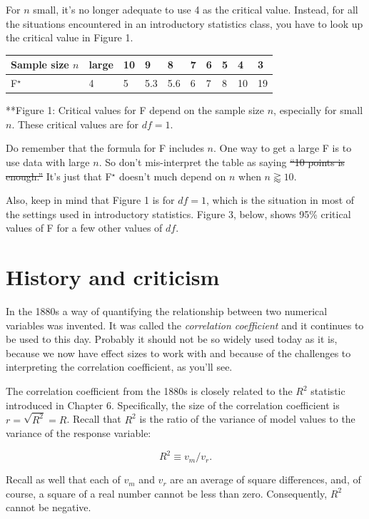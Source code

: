 \documentclass[]{book}
\begin{document}
For \(n\) small, it's no longer adequate to use 4 as the critical value. Instead, for all the situations encountered in an introductory statistics class, you have to look up the critical value in Figure 1.

\begin{longtable}[]{@{}llllllllll@{}}
\toprule
Sample size \(n\) & large & 10 & 9 & 8 & 7 & 6 & 5 & 4 & 3\tabularnewline
\midrule
\endhead
F\(^\star\) & 4 & 5 & 5.3 & 5.6 & 6 & 7 & 8 & 10 & 19\tabularnewline
\bottomrule
\end{longtable}

**Figure 1: Critical values for F depend on the sample size \(n\), especially for small \(n\). These critical values are for \(df=1\).

Do remember that the formula for F includes \(n\). One way to get a large F is to use data with large \(n\). So don't mis-interpret the table as saying \sout{``10 points is enough.''} It's just that F\(^\star\) doesn't much depend on \(n\) when \(n \gtrapprox 10\).

Also, keep in mind that Figure 1 is for \(df = 1\), which is the situation in most of the settings used in introductory statistics. Figure 3, below, shows 95\% critical values of F for a few other values of \(df\).

\hypertarget{history-and-criticism}{%
\section{History and criticism}\label{history-and-criticism}}

In the 1880s a way of quantifying the relationship between two numerical variables was invented. It was called the \emph{correlation coefficient} and it continues to be used to this day. Probably it should not be so widely used today as it is, because we now have effect sizes to work with and because of the challenges to interpreting the correlation coefficient, as you'll see.

The correlation coefficient from the 1880s is closely related to the \(R^2\) statistic introduced in Chapter 6. Specifically, the size of the correlation coefficient is \(r = \sqrt{R^2} = R\). Recall that \(R^2\) is the ratio of the variance of model values to the variance of the response variable:

\[R^2 \equiv v_m / v_r.\]

Recall as well that each of \(v_m\) and \(v_r\) are an average of square differences, and, of course, a square of a real number cannot be less than zero. Consequently, \(R^2\) cannot be negative.
\end{document}
